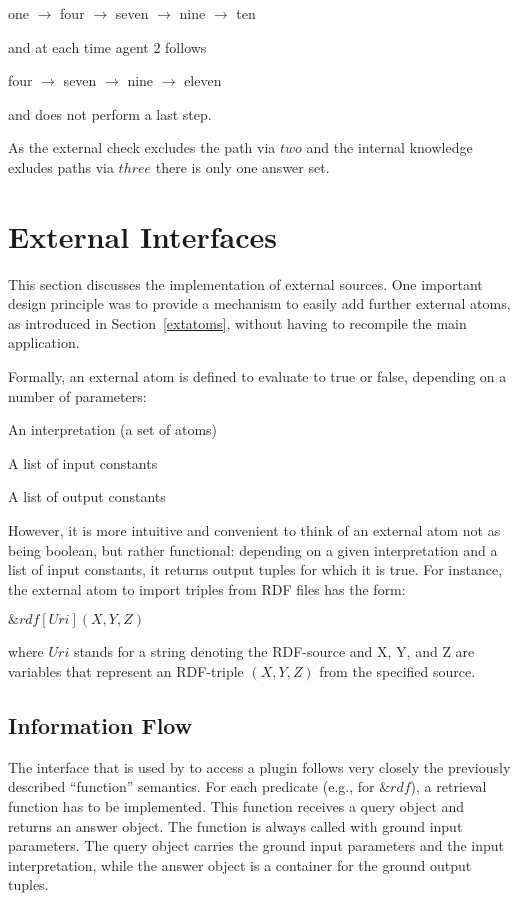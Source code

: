 \documentclass[a4paper, titlepage]{article}
\newcommand{\mi}[1]{\mathit{#1}}
\newcommand{\amp}[1]{\ensuremath{\&{\mathit{#1}}}}
\newcommand{\ext}[3]{\ensuremath{\&{\mathit{#1}}[#2](#3)}}
\newcommand\mycenterline[1]{\par\smallskip\centerline{#1} \smallskip}
\begin{document}
\centerline{%
  one $\rightarrow$ four $\rightarrow$ seven
  $\rightarrow$ nine $\rightarrow$ ten}
\smallskip
  
\noindent
and at each time agent $2$ follows
\smallskip

\centerline{%
  four $\rightarrow$ seven
  $\rightarrow$ nine $\rightarrow$ eleven}
\smallskip

\noindent
and does not perform a last step.

As the external check excludes the path via $two$
and the internal knowledge exludes paths via $three$
there is only one answer set.

\section{External Interfaces}
\label{sec:externalInterfaces}
This section discusses the implementation of external sources. One important design principle was to provide a 
mechanism to easily add further external atoms, as introduced in Section~\ref{extatoms}, without 
having to recompile the main application.
 
Formally, an external atom is defined to evaluate to true
or false, depending on a number of parameters:
\begin{compactitem}
\item An interpretation (a set of atoms)
\item A list of input constants
\item A list of output constants
\end{compactitem}  
However, it is more intuitive and convenient to think of an 
external atom not as being boolean, but rather functional:
depending on a given interpretation and a list of input 
constants, it returns output tuples for which it is true. For instance, the 
external atom to import triples from RDF files has the 
form:
\mycenterline{$\ext{rdf}{\mi{Uri}}{X,Y,Z}$} 
\noindent
where $\mathit{Uri}$ stands for a string denoting the RDF-source and X, Y, and Z are variables that represent an RDF-triple $(X,Y,Z)$ from the specified source.

\subsection{Information Flow}
The interface that is used by \dlvhex{} to access a plugin 
follows very closely the previously described ``function'' semantics.
For each predicate (e.g., for $\amp{rdf}$),
a retrieval function has to be implemented.
This function receives a query object and returns an answer object.
The function is always called with ground input parameters.
The query object carries the ground input parameters
and the input interpretation, 
while the answer object is a container for the ground output 
tuples.
\end{document}

